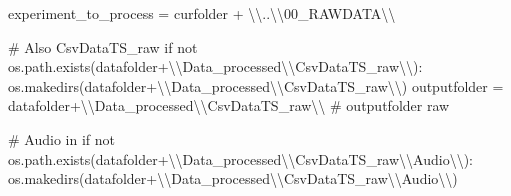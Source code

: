 \documentclass[
  letterpaper,
  DIV=11,
  numbers=noendperiod]{scrreprt}
\newenvironment{Shaded}{\begin{snugshade}}{\end{snugshade}}
\newcommand{\CharTok}[1]{\textcolor[rgb]{0.13,0.47,0.30}{#1}}
\newcommand{\CommentTok}[1]{\textcolor[rgb]{0.37,0.37,0.37}{#1}}
\newcommand{\ControlFlowTok}[1]{\textcolor[rgb]{0.00,0.23,0.31}{#1}}
\newcommand{\KeywordTok}[1]{\textcolor[rgb]{0.00,0.23,0.31}{#1}}
\newcommand{\NormalTok}[1]{\textcolor[rgb]{0.00,0.23,0.31}{#1}}
\newcommand{\OperatorTok}[1]{\textcolor[rgb]{0.37,0.37,0.37}{#1}}
\newcommand{\StringTok}[1]{\textcolor[rgb]{0.13,0.47,0.30}{#1}}
\begin{document}
\begin{Shaded}
\begin{Highlighting}[]
\NormalTok{experiment\_to\_process }\OperatorTok{=}\NormalTok{ curfolder }\OperatorTok{+} \StringTok{\textquotesingle{}}\CharTok{\textbackslash{}\textbackslash{}}\StringTok{..}\CharTok{\textbackslash{}\textbackslash{}}\StringTok{00\_RAWDATA}\CharTok{\textbackslash{}\textbackslash{}}\StringTok{\textquotesingle{}}

\CommentTok{\# Also CsvDataTS\_raw}
\ControlFlowTok{if} \KeywordTok{not}\NormalTok{ os.path.exists(datafolder}\OperatorTok{+}\StringTok{\textquotesingle{}}\CharTok{\textbackslash{}\textbackslash{}}\StringTok{Data\_processed}\CharTok{\textbackslash{}\textbackslash{}}\StringTok{CsvDataTS\_raw}\CharTok{\textbackslash{}\textbackslash{}}\StringTok{\textquotesingle{}}\NormalTok{):}
\NormalTok{    os.makedirs(datafolder}\OperatorTok{+}\StringTok{\textquotesingle{}}\CharTok{\textbackslash{}\textbackslash{}}\StringTok{Data\_processed}\CharTok{\textbackslash{}\textbackslash{}}\StringTok{CsvDataTS\_raw}\CharTok{\textbackslash{}\textbackslash{}}\StringTok{\textquotesingle{}}\NormalTok{)}
\NormalTok{outputfolder }\OperatorTok{=}\NormalTok{ datafolder}\OperatorTok{+}\StringTok{\textquotesingle{}}\CharTok{\textbackslash{}\textbackslash{}}\StringTok{Data\_processed}\CharTok{\textbackslash{}\textbackslash{}}\StringTok{CsvDataTS\_raw}\CharTok{\textbackslash{}\textbackslash{}}\StringTok{\textquotesingle{}} \CommentTok{\# outputfolder raw}

\CommentTok{\# Audio in}
\ControlFlowTok{if} \KeywordTok{not}\NormalTok{ os.path.exists(datafolder}\OperatorTok{+}\StringTok{\textquotesingle{}}\CharTok{\textbackslash{}\textbackslash{}}\StringTok{Data\_processed}\CharTok{\textbackslash{}\textbackslash{}}\StringTok{CsvDataTS\_raw}\CharTok{\textbackslash{}\textbackslash{}}\StringTok{Audio}\CharTok{\textbackslash{}\textbackslash{}}\StringTok{\textquotesingle{}}\NormalTok{):}
\NormalTok{    os.makedirs(datafolder}\OperatorTok{+}\StringTok{\textquotesingle{}}\CharTok{\textbackslash{}\textbackslash{}}\StringTok{Data\_processed}\CharTok{\textbackslash{}\textbackslash{}}\StringTok{CsvDataTS\_raw}\CharTok{\textbackslash{}\textbackslash{}}\StringTok{Audio}\CharTok{\textbackslash{}\textbackslash{}}\StringTok{\textquotesingle{}}\NormalTok{)}


\end{Highlighting}
\end{Shaded}
\end{document}
